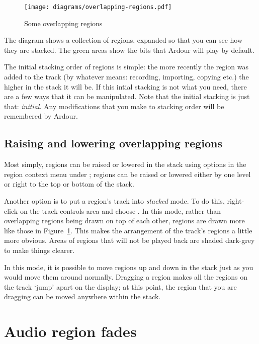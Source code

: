 \documentclass[10pt,a4paper]{book}
\newcommand{\menu}[1]{\emph{\StrSubstitute{#1}{,}{ $\rightarrow$ }}}
\begin{document}
{\begin{figure}[ht]
\begin{center}
\texttt{[image: diagrams/overlapping-regions.pdf]}
\end{center}
\caption{Some overlapping regions}
\label{fig:overlapping-regions}
\end{figure}

The diagram shows a collection of regions, expanded so that you can
see how they are stacked.  The green areas show the bits that Ardour
will play by default.

The initial stacking order of regions is simple: the more recently the
region was added to the track (by whatever means: recording,
importing, copying etc.) the higher in the stack it will be.  If this
intial stacking is not what you need, there are a few ways that it can
be manipulated.  Note that the initial stacking is just that:
\emph{initial}.  Any modifications that you make to stacking order
will be remembered by Ardour.



\subsection{Raising and lowering overlapping regions}

Most simply, regions can be raised or lowered in the stack using
options in the region context menu under \menu{Layering}; regions can
be raised or lowered either by one level or right to the top or bottom
of the stack.

Another option is to put a region's track into \emph{stacked} mode.
To do this, right-click on the track controls area and choose
\menu{Layers,Stacked}.  In this mode, rather than overlapping regions
being drawn on top of each other, regions are drawn more like those in
Figure~\ref{fig:overlapping-regions}.  This makes the arrangement of
the track's regions a little more obvious.  Areas of regions that will
not be played back are shaded dark-grey to make things clearer.

In this mode, it is possible to move regions up and down in the stack
just as you would move them around normally.  Dragging a region makes
all the regions on the track `jump' apart on the display; at this
point, the region that you are dragging can be moved anywhere within
the stack.



\section{Audio region fades}

}
\end{document}
